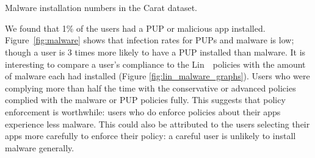 \documentclass[thesis.tex]{subfiles}
\begin{document}
\begin{marginfigure}
  \centering
  \\
  \\
  \caption{Malware installation numbers in the Carat dataset.}
  \label{fig:malware}
\end{marginfigure}
We found that 1\% of the users had a \ac{PUP} or malicious app installed.
Figure~\ref{fig:malware} shows that infection rates for \acp{PUP} and malware is low;
though a user is 3 times more likely to have a \ac{PUP} installed than malware.
It is interesting to compare a user's compliance to the Lin~\etal~policies with the amount of malware each had installed (Figure \autoref{fig:lin_malware_graphs}).
Users who were complying more than half the time with the conservative or advanced policies complied with the malware or \ac{PUP} policies fully.
This suggests that policy enforcement is worthwhile: users who do enforce policies about their apps experience less malware.
This could also be attributed to the users selecting their apps more carefully to enforce their policy: a careful user is unlikely to install malware generally.
\end{document}
